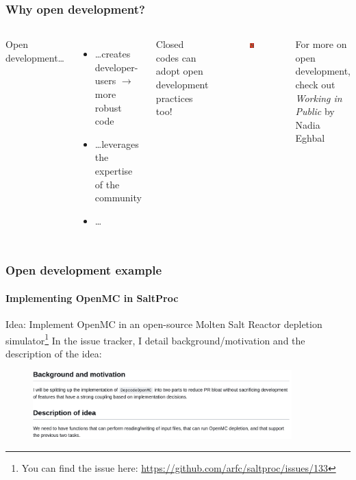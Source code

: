 \begin{frame}
  \frametitle{Why open development?} 
  \begin{columns}
      \column[t]{5cm}
      Open development\ldots
      \begin{itemize}
          \item \ldots creates developer-users $\rightarrow$ more robust code
          \item \ldots leverages the expertise of the community 
          \item \ldots 
      \end{itemize}

      Closed codes can adopt open development practices too!

      \column[t]{5cm}
      \begin{figure}[htpb]
          \centering
          \includegraphics[width=2cm]{images/working-in-public.png}
      \end{figure}
      For more on open development, check out {\it Working in Public} by Nadia Eghbal \cite{eghbal_working_2020}

      
  \end{columns}
\end{frame}

\begin{frame}[fragile]
    \frametitle{Open development example}
    \framesubtitle{Implementing OpenMC in SaltProc}

    Idea: Implement OpenMC in an open-source Molten Salt Reactor depletion simulator\footnote{You can find the issue here: \url{https://github.com/arfc/saltproc/issues/133}} 
    \newline
    \newline
    In the issue tracker, I detail background/motivation and the description of the idea:


    \vspace{0.5cm}
    \begin{figure}[htpb]
        \centering
        \includegraphics[width=10cm]{images/open-dev-ex1.png}
    \end{figure}

    
\end{frame}


